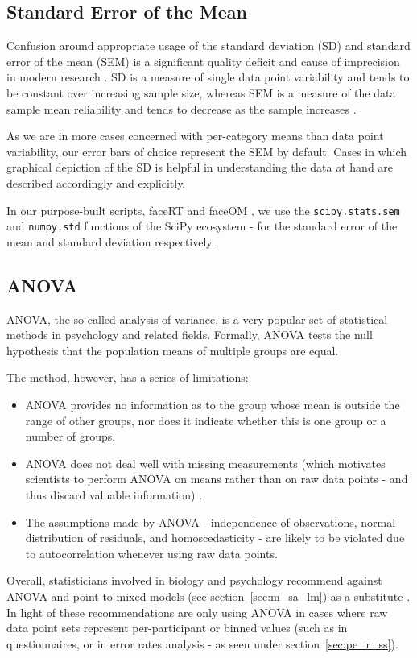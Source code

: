 	\subsection{Standard Error of the Mean}\label{sec:m_sa_se}
	    Confusion around appropriate usage of the standard deviation (SD) and standard error of the mean (SEM) is a significant quality deficit and cause of imprecision in modern research \citep{Nagele2003}.
	    SD is a measure of single data point variability and tends to be constant over increasing sample size, 
	    whereas SEM is a measure of the data sample mean reliability and tends to decrease as the sample increases \citep{Altman2005,Streiner1996}.
	    
	    As we are in more cases concerned with per-category means than data point variability, our error bars of choice represent the SEM by default.
	    Cases in which graphical depiction of the SD is helpful in understanding the data at hand are described accordingly and explicitly.
	    
	    In our purpose-built scripts, faceRT \citep{faceRT} and faceOM \citep{faceOM}, we use the \colorbox{vlg}{\texttt{scipy.stats.sem}} and \colorbox{vlg}{\texttt{numpy.std}} functions of the SciPy ecosystem \citep{scipy,Oliphant2007} -
	    for the standard error of the mean and standard deviation respectively.
	\subsection{ANOVA}\label{sec:m_sa_a}
	    ANOVA, the so-called analysis of variance, is a very popular set of statistical methods in psychology and related fields.
	    Formally, ANOVA tests the null hypothesis that the population means of multiple groups are equal.
	    
	    The method, however, has a series of limitations:
	    \begin{itemize}
		\item ANOVA provides no information as to the group whose mean is outside the range of other groups, nor does it indicate whether this is one group or a number of groups.
		\item ANOVA does not deal well with missing measurements (which motivates scientists to perform ANOVA on means rather than on raw data points - and thus discard valuable information) \citep{Gueorguieva2004}.
		\item The assumptions made by ANOVA - independence of observations, normal distribution of residuals, and homoscedasticity \citep{Anderson1996} - are likely to be violated due to autocorrelation whenever using raw data points. 
	    \end{itemize}
	    Overall, statisticians involved in biology and psychology recommend against ANOVA and point to mixed models (see section~\ref{sec:m_sa_lm}) as a substitute \citep{Baayen2008,Gueorguieva2004}. 
	    In light of these recommendations are only using ANOVA in cases where raw data point sets represent per-participant or binned values 
	    (such as in questionnaires, or in error rates analysis - as seen under section~\ref{sec:pe_r_ss}).
	    
